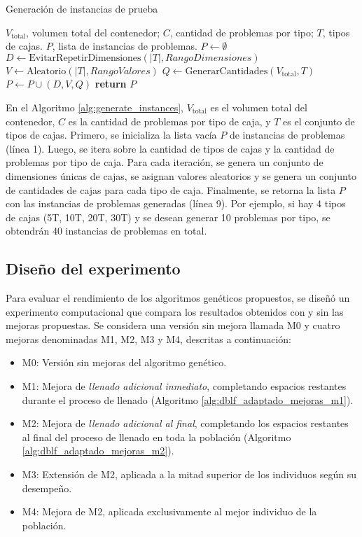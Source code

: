\begin{algorithm}[H]
    \caption{Generación de instancias de prueba}
    \label{alg:generate_instances}
    \begin{algorithmic}[1]
        \Require $V_{\text{total}}$, volumen total del contenedor; $C$, cantidad de problemas por tipo; $T$, tipos de cajas.
        \Ensure $P$, lista de instancias de problemas.
        \State $P \gets \emptyset$
        \State $D \gets \text{EvitarRepetirDimensiones}(|T|, RangoDimensiones)$
        \State $V \gets \text{Aleatorio}(|T|, RangoValores)$
        \State $Q \gets \text{GenerarCantidades}(V_{\text{total}}, T)$
        \State $P \gets P \cup (D, V, Q)$
        \EndFor
        \EndFor
        \State \textbf{return} $P$
    \end{algorithmic}
\end{algorithm}

En el Algoritmo \ref{alg:generate_instances}, $V_{\text{total}}$ es el volumen total del contenedor, $C$ es la cantidad de problemas por tipo de caja, y $T$ es el conjunto de tipos de cajas. Primero, se inicializa la lista vacía $P$ de instancias de problemas (línea 1). Luego, se itera sobre la cantidad de tipos de cajas y la cantidad de problemas por tipo de caja. Para cada iteración, se genera un conjunto de dimensiones únicas de cajas, se asignan valores aleatorios y se genera un conjunto de cantidades de cajas para cada tipo de caja. Finalmente, se retorna la lista $P$ con las instancias de problemas generadas (línea 9). Por ejemplo, si hay 4 tipos de cajas (5T, 10T, 20T, 30T) y se desean generar 10 problemas por tipo, se obtendrán 40 instancias de problemas en total.

\subsection{Diseño del experimento}

Para evaluar el rendimiento de los algoritmos genéticos propuestos, se diseñó un experimento computacional que compara los resultados obtenidos con y sin las mejoras propuestas. Se considera una versión sin mejora llamada M0 y cuatro mejoras denominadas M1, M2, M3 y M4, descritas a continuación:

\begin{itemize}
    \item M0: Versión sin mejoras del algoritmo genético.
    \item M1: Mejora de \textit{llenado adicional inmediato}, completando espacios restantes durante el proceso de llenado (Algoritmo \ref{alg:dblf_adaptado_mejoras_m1}).
    \item M2: Mejora de \textit{llenado adicional al final}, completando los espacios restantes al final del proceso de llenado en toda la población (Algoritmo \ref{alg:dblf_adaptado_mejoras_m2}).
    \item M3: Extensión de M2, aplicada a la mitad superior de los individuos según su desempeño.
    \item M4: Mejora de M2, aplicada exclusivamente al mejor individuo de la población.
\end{itemize}

